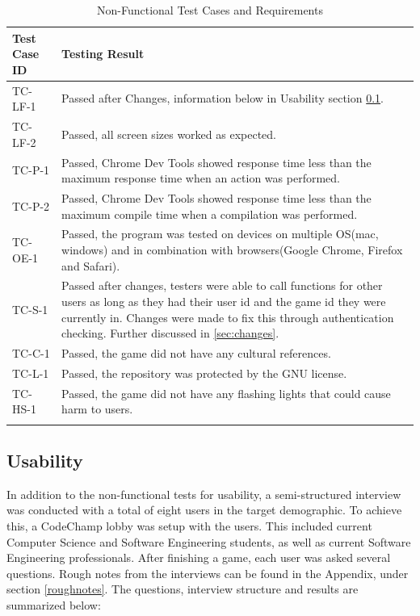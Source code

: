 \documentclass[12pt, titlepage]{article}
\begin{document}
\begin{longtable}{| p{2.5cm} | p{11cm} |}
    \hline
    Test Case ID & Testing Result\\
    \hline
    TC-LF-1 & Passed after Changes, information below in Usability section \ref{sec:usabilty}.\\
    \hline
    TC-LF-2 & Passed, all screen sizes worked as expected.\\
    \hline
    TC-P-1 & Passed, Chrome Dev Tools showed response time less than the maximum response time when an action was performed.\\
    \hline
    TC-P-2 & Passed, Chrome Dev Tools showed response time less than the maximum compile time when a compilation was performed. \\
     \hline
    TC-OE-1 & Passed, the program was tested on devices on multiple OS(mac, windows) and in combination with browsers(Google Chrome, Firefox and Safari).\\
     \hline
    TC-S-1 & Passed after changes, testers were able to call functions for other users as long as they had their user id and the game id they were currently in. Changes were made to fix this through authentication checking. Further discussed in \ref{sec:changes}.\\
     \hline
    TC-C-1 & Passed, the game did not have any cultural references.\\
     \hline
    TC-L-1 & Passed, the repository was protected by the GNU license.\\
     \hline
     TC-HS-1 & Passed, the game did not have any flashing lights that could cause harm to users.\\
     \hline
    \caption{Non-Functional Test Cases and Requirements}
    \label{tab:non-functional Tests Requirements}
\end{longtable}

\subsection{Usability}\label{sec:usabilty}

In addition to the non-functional tests for usability, a semi-structured interview was conducted with a total of eight users in the target demographic. To achieve this, a CodeChamp lobby was setup with the users. This included current Computer Science and Software Engineering students, as well as current Software Engineering professionals. After finishing a game, each user was asked several questions. Rough notes from the interviews can be found in the Appendix, under section \ref{roughnotes}. The questions, interview structure and results are summarized below:
\end{document}

